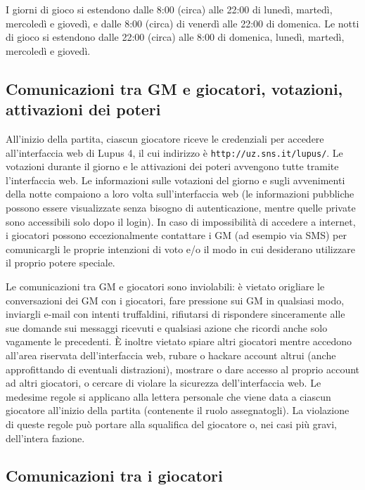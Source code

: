 \documentclass[a4paper,10pt]{article}
\begin{document}
I giorni di gioco si estendono dalle 8:00 (circa) alle 22:00 di lunedì, martedì, mercoledì e giovedì, e dalle 8:00 (circa) di venerdì alle 22:00 di domenica.
Le notti di gioco si estendono dalle 22:00 (circa) alle 8:00 di domenica, lunedì, martedì, mercoledì e giovedì.



\subsection{Comunicazioni tra GM e giocatori, votazioni, attivazioni dei poteri}

All'inizio della partita, ciascun giocatore riceve le credenziali per accedere all'interfaccia web di Lupus 4, il cui indirizzo è \verb|http://uz.sns.it/lupus/|.
Le votazioni durante il giorno e le attivazioni dei poteri avvengono tutte tramite l'interfaccia web. Le informazioni sulle votazioni del giorno e sugli avvenimenti della notte compaiono a loro volta sull'interfaccia web (le informazioni pubbliche possono essere visualizzate senza bisogno di autenticazione, mentre quelle private sono accessibili solo dopo il login).
In caso di impossibilità di accedere a internet, i giocatori possono eccezionalmente contattare i GM (ad esempio via SMS) per comunicargli le proprie intenzioni di voto e/o il modo in cui desiderano utilizzare il proprio potere speciale.

Le comunicazioni tra GM e giocatori sono inviolabili: è vietato origliare le conversazioni dei GM con i giocatori, fare pressione sui GM in qualsiasi modo, inviargli e-mail con intenti truffaldini, rifiutarsi di rispondere sinceramente alle sue domande sui messaggi ricevuti e qualsiasi azione che ricordi anche solo vagamente le precedenti.
È inoltre vietato spiare altri giocatori mentre accedono all'area riservata dell'interfaccia web, rubare o hackare account altrui (anche approfittando di eventuali distrazioni), mostrare o dare accesso al proprio account ad altri giocatori, o cercare di violare la sicurezza dell'interfaccia web.
Le medesime regole si applicano alla lettera personale che viene data a ciascun giocatore all'inizio della partita (contenente il ruolo assegnatogli).
La violazione di queste regole può portare alla squalifica del giocatore o, nei casi più gravi, dell'intera fazione.


\subsection{Comunicazioni tra i giocatori}
\end{document}
